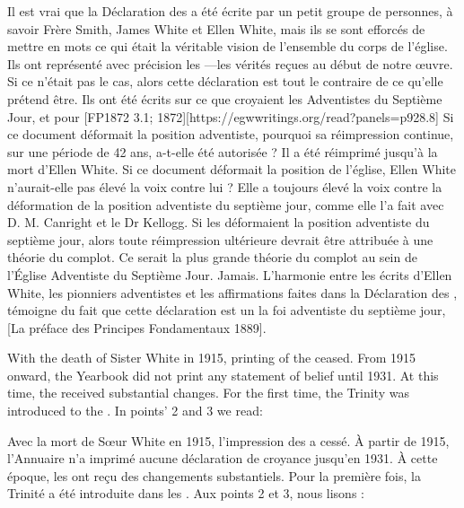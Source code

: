 Il est vrai que la Déclaration des  a été écrite par un petit groupe de personnes, à savoir Frère Smith, James White et Ellen White, mais ils se sont efforcés de mettre en mots ce qui était la véritable vision de l'ensemble du corps de l'église. Ils ont représenté avec précision les —les vérités reçues au début de notre œuvre. Si ce n'était pas le cas, alors cette déclaration est tout le contraire de ce qu'elle prétend être. Ils ont été écrits  sur ce que croyaient les Adventistes du Septième Jour,  et pour [FP1872 3.1; 1872][https://egwwritings.org/read?panels=p928.8] Si ce document déformait la position adventiste, pourquoi sa réimpression continue, sur une période de 42 ans, a-t-elle été autorisée ? Il a été réimprimé jusqu'à la mort d'Ellen White. Si ce document déformait la position de l'église, Ellen White n'aurait-elle pas élevé la voix contre lui ? Elle a toujours élevé la voix contre la déformation de la position adventiste du septième jour, comme elle l'a fait avec D. M. Canright et le Dr Kellogg. Si les  déformaient la position adventiste du septième jour, alors toute réimpression ultérieure devrait être attribuée à une théorie du complot. Ce serait la plus grande théorie du complot au sein de l'Église Adventiste du Septième Jour. Jamais. L'harmonie entre les écrits d'Ellen White, les pionniers adventistes et les affirmations faites dans la Déclaration des , témoigne du fait que cette déclaration est un  la foi adventiste du septième jour, [La préface des Principes Fondamentaux 1889].


With the death of Sister White in 1915, printing of the  ceased. From 1915 onward, the Yearbook did not print any statement of belief until 1931. At this time, the  received substantial changes. For the first time, the Trinity was introduced to the . In points’ 2 and 3 we read:


Avec la mort de Sœur White en 1915, l'impression des  a cessé. À partir de 1915, l'Annuaire n'a imprimé aucune déclaration de croyance jusqu'en 1931. À cette époque, les  ont reçu des changements substantiels. Pour la première fois, la Trinité a été introduite dans les . Aux points 2 et 3, nous lisons :


